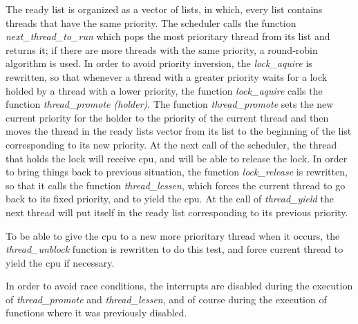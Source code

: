 	The ready list is organized as a vector of lists, in which, every list contains threads that have the same priority. The scheduler calls the function \textit{next\_thread\_to\_run} which pops the most prioritary thread from its list and returns it; if there are more threads with the same priority, a round-robin algorithm is used. In order to avoid priority inversion, the \textit{lock\_aquire} is rewritten, so that whenever a thread with a greater priority waits for a lock holded by a thread with a lower priority, the function \textit{lock\_aquire} calls the function \textit{thread\_promote (holder)}. The function \textit{thread\_promote} sets the new current priority  for the holder to the priority of the current thread and then moves the thread in the ready lists vector from its list to the beginning of the list corresponding to its new priority. At the next call of the scheduler, the thread that holds the lock will receive cpu, and will be able to release the lock. In order to bring things back to previous situation, the function \textit{lock\_release} is rewritten, so that it calls the function \textit{thread\_lessen}, which forces the current thread to go back to its fixed priority, and to yield the cpu. At the call of \textit{thread\_yield} the next thread will put itself in the ready list corresponding to its previous priority. 

	To be able to give the cpu to a new more prioritary thread when it occurs, the \textit{thread\_unblock} function is rewritten to do this test, and force current thread to yield the cpu if necessary.

	In order to avoid race conditions, the interrupts are disabled during the execution of \textit{thread\_promote} and \textit{thread\_lessen}, and of course during the execution of functions where it was previously disabled.




